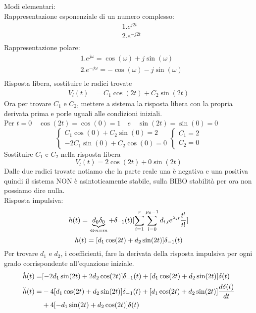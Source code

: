 		Modi elementari:\\
		Rappresentazione esponenziale di un numero complesso:\\
		\[
		\begin{split}
		&1. e^{j2t}\\
		&2. e^{-j2t}\\
		\end{split}
		\]
		Rappresentazione polare:\\
		\[
		\begin{split}
		&1. e^{j\omega} = \cos(\omega)+j\sin(\omega)\\
		&2. e^{-j\omega} = -\cos(\omega)-j\sin(\omega)\\
		\end{split}
		\]
		Risposta libera, sostituire le radici trovate
		\[
		\begin{split}
		V_l(t)&=C_1\cos(2t)+C_2\sin(2t)
		\end{split}
		\]
		Ora per trovare $C_1$ e $C_2$, mettere a sistema la risposta libera con la propria derivata prima e porle uguali alle condizioni iniziali.\\
		Per $t=0 \quad \cos(2t) = \cos(0) = 1 \quad e \quad \sin(2t) = \sin(0) = 0$
		\[
		\begin{cases}
		C_1\cos(0)+C_2\sin(0) = 2\\
		-2C_1\sin(0)+C_2\cos(0) = 0 
		\end{cases}
		\begin{cases}
		C_1 = 2\\
		C_2 = 0
		\end{cases}
		\]
		Sostituire $C_1$ e $C_2$ nella risposta libera
		\[V_l(t) = 2\cos(2t)+0\sin(2t)\]
		Dalle due radici trovate notiamo che la parte reale una è negativa e una positiva quindi il sistema NON è asintoticamente stabile, sulla BIBO stabilità per ora non possiamo dire nulla.\\
		Risposta impulsiva:\\
		\[
		h(t)= \underbrace{d_0\delta_0}_{\Leftrightarrow n=m}  + \delta_{-1}(t)[\sum_{i = 1}^{r}\sum_{l=0}^{\mu_0-1}d_{i,l}e^{\lambda_it}\frac{t^l}{t!}]
		\]
		\[ h(t)=[d_1\cos(2t) + d_2\sin(2t)] \delta_{-1}(t)\]
		Per trovare $d_1$ e $d_2$, i coefficienti, fare la derivata della risposta impulsiva per ogni grado corrispondente all'equazione iniziale.\\
		\[
		\begin{split}
		\dot{h}(t) =& [-2d_1\sin(2t)+2d_2\cos(2t)]\delta_{-1}(t)+[d_1\cos(2t)+d_2\sin(2t)]\delta(t)\\
		\ddot{h}(t) =& -4[d_1\cos(2t)+d_2\sin(2t)]\delta_{-1}(t)+[d_1\cos(2t)+d_2\sin(2t)]\frac{d\delta(t)}{dt}\\
		&+4[-d_1\sin(2t)+d_2\cos(2t)]\delta(t)\\
		\end{split}
		\]
